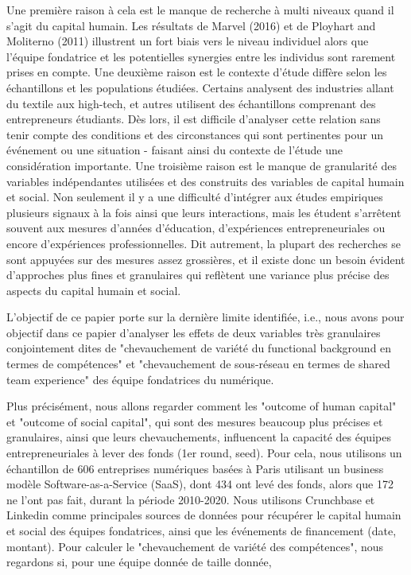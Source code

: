 \documentclass[11pt]{article}
\begin{document}
Une première raison à cela est le manque de recherche à multi niveaux quand il s'agit du capital humain. Les résultats de Marvel (2016) et de Ployhart and Moliterno (2011) illustrent un fort biais vers le niveau individuel alors que l'équipe fondatrice et les potentielles synergies entre les individus sont rarement prises en compte. Une deuxième raison est le contexte d'étude diffère selon les échantillons et les populations étudiées. Certains analysent des industries allant du textile aux high-tech, et autres utilisent des échantillons comprenant des entrepreneurs étudiants. Dès lors, il est difficile d'analyser cette relation sans tenir compte des conditions et des circonstances qui sont pertinentes pour un événement ou une situation - faisant ainsi du contexte de l'étude une considération importante. Une troisième raison est le manque de granularité des variables indépendantes utilisées et des construits des variables de capital humain et social. Non seulement il y a une difficulté d'intégrer aux études empiriques plusieurs signaux à la fois ainsi que leurs interactions, mais les étudent s'arrêtent souvent aux mesures d'années d'éducation, d'expériences entrepreneuriales ou encore d'expériences professionnelles. Dit autrement, la plupart des recherches se sont appuyées sur des mesures assez grossières, et il existe donc un besoin évident d'approches plus fines et granulaires qui reflètent une variance plus précise des aspects du capital humain et social.

L'objectif de ce papier porte sur la dernière limite identifiée, i.e., nous avons pour objectif dans ce papier d'analyser les effets de deux variables très granulaires conjointement dites de "chevauchement de variété du functional background en termes de compétences" et "chevauchement de sous-réseau en termes de shared team experience" des équipe fondatrices du numérique.


Plus précisément, nous allons regarder comment les "outcome of human capital" et "outcome of social capital", qui sont des mesures beaucoup plus précises et granulaires, ainsi que leurs chevauchements, influencent la capacité des équipes entrepreneuriales à lever des fonds (1er round, seed). Pour cela, nous utilisons un échantillon de 606 entreprises numériques basées à Paris utilisant un business modèle Software-as-a-Service (SaaS), dont 434 ont levé des fonds, alors que 172 ne l'ont pas fait, durant la période 2010-2020. Nous utilisons Crunchbase et Linkedin comme principales sources de données pour récupérer le capital humain et social des équipes fondatrices, ainsi que les événements de financement (date, montant). Pour calculer le "chevauchement de variété des compétences", nous regardons si, pour une équipe donnée de taille donnée,
\end{document}
